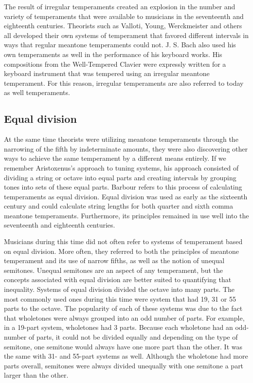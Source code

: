 The result of irregular temperaments created an explosion in the number and
variety of temperaments that were available to musicians in the seventeenth and
eighteenth centuries.  Theorists such as Valloti, Young, Werckmeister and others
all developed their own systems of temperament that favored different intervals
in ways that regular meantone temperaments could not.  J. S. Bach also used his
own temperaments as well in the performance of his keyboard works.  His
compositions from the Well-Tempered Clavier were expressly written for a
keyboard instrument that was tempered using an irregular meantone temperament.
For this reason, irregular temperaments are also referred to today as well
temperaments.

\subsection{Equal division}

At the same time theorists were utilizing meantone temperaments through the
narrowing of the fifth by indeterminate amounts, they were
also discovering other ways to achieve the same temperament by a different means
entirely.  If we remember Aristoxenus's approach to tuning
systems, his approach consisted of dividing a string or octave into equal
parts and creating intervals by grouping tones into sets of these equal parts.
Barbour refers to this process of calculating temperaments as equal division.
Equal division was used as early as the sixteenth century and could calculate string lengths
for both quarter and sixth comma meantone temperaments.
Furthermore, its principles remained in use well into the seventeenth and
eighteenth centuries.

Musicians during this time did not often refer to systems of temperament based on
equal division.  More often, they referred to both
the principles of meantone temperament and its use of narrow fifths,
as well as the notion of unequal semitones.  Unequal semitones are an aspect
of any temperament, but the concepts associated with equal
division are better suited to quantifying that inequality.  Systems
of equal division divided the octave into many parts.  The most commonly used
ones during this time were system that had 19, 31 or 55 parts to the octave.  The popularity
of each of these systems was due to the fact that wholetones
were always grouped into an odd number of parts.  For example, in a 19-part system, wholetones had
3 parts.  Because each wholetone had an odd-number
of parts, it could not be divided equally and depending on the type of semitone, one semitone
would always have one more part than the other.  It was the same with 31- and 55-part systems
as well.  Although the wholetone had more parts overall, semitones were always divided unequally
with one semitone a part larger than the other.

